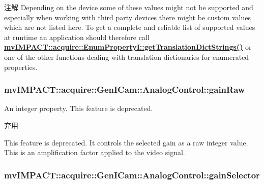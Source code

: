 \begin{DoxyNote}{注解}
Depending on the device some of these values might not be supported and especially when working with third party devices there might be custom values which are not listed here. To get a complete and reliable list of supported values at runtime an application should therefore call {\bfseries \hyperlink{classmv_i_m_p_a_c_t_1_1acquire_1_1_enum_property_i_a0ba6ccbf5ee69784d5d0b537924d26b6}{mv\+I\+M\+P\+A\+C\+T\+::acquire\+::\+Enum\+Property\+I\+::get\+Translation\+Dict\+Strings()}} or one of the other functions dealing with translation dictionaries for enumerated properties. 
\end{DoxyNote}
\hypertarget{classmv_i_m_p_a_c_t_1_1acquire_1_1_gen_i_cam_1_1_analog_control_ade519853cab79cfd6c2ac5564d9ed568}{
\subsubsection[{gain\+Raw}]{ mv\+I\+M\+P\+A\+C\+T\+::acquire\+::\+Gen\+I\+Cam\+::\+Analog\+Control\+::gain\+Raw}}\label{classmv_i_m_p_a_c_t_1_1acquire_1_1_gen_i_cam_1_1_analog_control_ade519853cab79cfd6c2ac5564d9ed568}


An integer property. This feature is deprecated. 

\begin{DoxyRefDesc}{弃用}
\item[\hyperlink{deprecated__deprecated000048}{弃用}]This feature is deprecated. It controls the selected gain as a raw integer value. This is an amplification factor applied to the video signal. \end{DoxyRefDesc}
\hypertarget{classmv_i_m_p_a_c_t_1_1acquire_1_1_gen_i_cam_1_1_analog_control_a48fb299bea5b80eb2e113ba4f28fd489}{
\subsubsection[{gain\+Selector}]{ mv\+I\+M\+P\+A\+C\+T\+::acquire\+::\+Gen\+I\+Cam\+::\+Analog\+Control\+::gain\+Selector}}\label{classmv_i_m_p_a_c_t_1_1acquire_1_1_gen_i_cam_1_1_analog_control_a48fb299bea5b80eb2e113ba4f28fd489}


